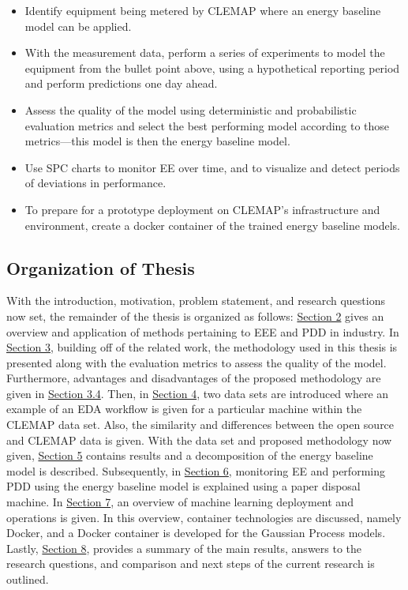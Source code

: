 \begin{itemize}
    \item Identify equipment being metered by CLEMAP where an energy baseline model can be applied.
    
    \item With the measurement data, perform a series of experiments to model the equipment from the bullet point above, using a hypothetical reporting period and perform predictions one day ahead.
    
    \item Assess the quality of the model using deterministic and probabilistic evaluation metrics and select the best performing model according to those metrics—this model is then the energy baseline model.
    
    \item Use \ac{SPC} charts to monitor EE over time, and to visualize and detect periods of deviations in performance. 
    
    \item To prepare for a prototype deployment on CLEMAP's infrastructure and environment, create a docker container of the trained energy baseline models.
\end{itemize}

\subsection{Organization of Thesis}

With the introduction, motivation, problem statement, and research questions now set, the remainder of the thesis is organized as follows: \hyperlink{section.2}{Section 2} gives an overview and application of methods pertaining to EEE and PDD in industry. In \hyperlink{section.3}{Section 3}, building off of the related work, the methodology used in this thesis is presented along with the evaluation metrics to assess the quality of the model. Furthermore, advantages and disadvantages of the proposed methodology are given in \hyperlink{subsection.3.4}{Section 3.4}. Then, in \hyperlink{section.4}{Section 4}, two data sets are introduced where an example of an \ac{EDA} workflow is given for a particular machine within the CLEMAP data set. Also, the similarity and differences between the open source and CLEMAP data is given. With the data set and proposed methodology now given, \hyperlink{section.5}{Section 5} contains results and a decomposition of the energy baseline model is described. Subsequently, in \hyperlink{section.6}{Section 6}, monitoring EE and performing PDD using the energy baseline model is explained using a paper disposal machine. In \hyperlink{section.7}{Section 7}, an overview of machine learning deployment and operations is given. In this overview, container technologies are discussed, namely Docker, and a Docker container is developed for the Gaussian Process models. Lastly, \hyperlink{section.8}{Section 8}, provides a summary of the main results, answers to the research questions, and comparison and next steps of the current research is outlined.